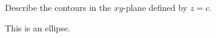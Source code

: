 Describe the contours in the $xy$-plane defined by $z = c$.

\begin{solution}
    This is an ellipse.
\end{solution}